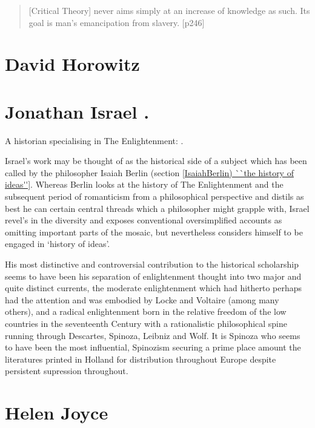 \documentclass[10pt,titlepage]{book}
\begin{document}
\begin{quote}
  [Critical Theory] never aims simply at an increase of knowledge as such. Its goal is man's emancipation from slavery. [p246]
\end{quote}

\section{David Horowitz}

\cite{horowitz-paau,horowitz-bbal}

\section{Jonathan Israel \cite{israel2011revolution,israel2013democratic,israel2006enlightenment,israel2002radical}.}

A historian specialising in The Enlightenment:
\cite{israel2011revolution,israel2013democratic,israel2006enlightenment,israel2002radical}.

Israel's work may be thought of as the historical side of a subject which has been called by the philosopher Isaiah Berlin (section \ref{IsaiahBerlin) ``the history of ideas''}.
Whereas Berlin looks at the history of The Enlightenment and the subsequent period of romanticism from a philosophical perspective and distils as best he can certain central threads which a philosopher might grapple with, Israel revel's in the diversity and exposes conventional oversimplified accounts as omitting important parts of the mosaic, but nevertheless considers himself to be engaged in `history of ideas'.

His most distinctive and controversial contribution to the historical scholarship seems to have been his separation of enlightenment thought into two major and quite distinct currents, the moderate enlightenment which had hitherto perhaps had the attention and was embodied by Locke and Voltaire (among many others), and a radical enlightenment born in the relative freedom of the low countries in the seventeenth Century with a rationalistic philosophical spine running through Descartes, Spinoza, Leibniz and Wolf.
It is Spinoza who seems to have been the most influential, Spinozism securing a prime place amount the literatures printed in Holland for distribution throughout Europe despite persistent supression throughout.


\section{Helen Joyce}
\end{document}
